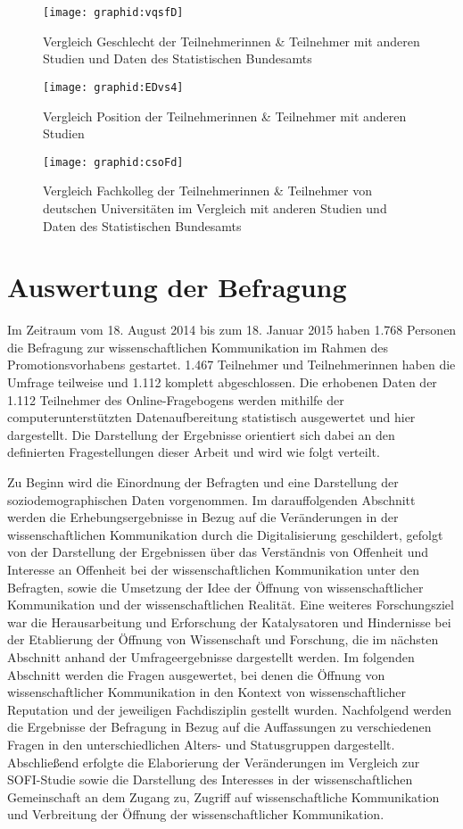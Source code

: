 \begin{figure}[h!]
\texttt{[image: graphid:vqsfD]}
\caption{Vergleich Geschlecht der Teilnehmerinnen & Teilnehmer mit anderen Studien und Daten des Statistischen Bundesamts}
\end{figure}

\begin{figure}[h!]
\texttt{[image: graphid:EDvs4]}
\caption{Vergleich Position der Teilnehmerinnen & Teilnehmer mit anderen Studien}
\end{figure}

\begin{figure}[h!]
\texttt{[image: graphid:csoFd]}
\caption{Vergleich Fachkolleg der Teilnehmerinnen & Teilnehmer von deutschen Universitäten im Vergleich mit anderen Studien und Daten des Statistischen Bundesamts}
\end{figure}

\section{Auswertung der Befragung}

Im Zeitraum vom 18. August 2014 bis zum 18. Januar 2015 haben 1.768 Personen die Befragung zur wissenschaftlichen Kommunikation im Rahmen des Promotionsvorhabens gestartet. 1.467 Teilnehmer und Teilnehmerinnen haben die Umfrage teilweise und 1.112 komplett abgeschlossen. Die erhobenen Daten der 1.112 Teilnehmer des Online-Fragebogens werden mithilfe der computerunterstützten Datenaufbereitung statistisch ausgewertet und hier dargestellt. Die Darstellung der Ergebnisse orientiert sich dabei an den definierten Fragestellungen dieser Arbeit und wird wie folgt verteilt.

Zu Beginn wird die Einordnung der Befragten und eine Darstellung der soziodemographischen Daten vorgenommen. Im darauffolgenden Abschnitt werden die Erhebungsergebnisse in Bezug auf die Veränderungen in der wissenschaftlichen Kommunikation durch die Digitalisierung geschildert, gefolgt von der Darstellung der Ergebnissen über das Verständnis von Offenheit und Interesse an Offenheit bei der wissenschaftlichen Kommunikation unter den Befragten, sowie die Umsetzung der Idee der Öffnung von wissenschaftlicher Kommunikation und der wissenschaftlichen Realität. Eine weiteres Forschungsziel war die Herausarbeitung und Erforschung der Katalysatoren und Hindernisse bei der Etablierung der Öffnung von Wissenschaft und Forschung, die im nächsten Abschnitt anhand der Umfrageergebnisse dargestellt werden. Im folgenden Abschnitt werden die Fragen ausgewertet, bei denen die Öffnung von wissenschaftlicher Kommunikation in den Kontext von wissenschaftlicher Reputation und der jeweiligen Fachdisziplin gestellt wurden. Nachfolgend werden die Ergebnisse der Befragung in Bezug auf die Auffassungen zu verschiedenen Fragen in den unterschiedlichen Alters- und Statusgruppen dargestellt. Abschließend erfolgte die Elaborierung der Veränderungen im Vergleich zur SOFI-Studie sowie die  Darstellung des Interesses in der wissenschaftlichen Gemeinschaft an dem Zugang zu, Zugriff auf wissenschaftliche Kommunikation und Verbreitung der Öffnung der wissenschaftlicher Kommunikation.

